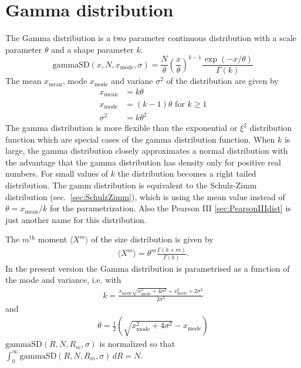 

\clearpage
\section{Gamma distribution}
\label{sec:SZGammaDistr}

The Gamma distribution is a two parameter continuous distribution with
a scale parameter $\theta$ and a shape parameter $k$.
\begin{equation}
\text{gammaSD}(x,N,x_\text{mode},\sigma) =  \frac{N}{\theta}
\left(\frac{x}{\theta}\right)^{k-1}
\frac{\exp(-x/\theta)}{\Gamma(k)} \label{GammaSDEq}
\end{equation}
The mean $x_\text{mean}$, mode $x_\text{mode}$ and variane $\sigma^2$
of the distribution are given by
\begin{align}
x_\text{mean}   &= k\theta \\
x_\text{mode}   &= (k-1)\theta \text{ for } k\geq 1 \\
\sigma^2        &= k\theta^2
\end{align}
The gamma distribution is more flexible than the exponential or $\xi^2$ distribution
function which are special cases of the gamma distribution function.
When $k$ is large, the gamma distribution closely approximates a normal distribution
with the advantage that the gamma distribution has density only for positive real
numbers. For small values of $k$ the distribution becomes a right tailed distribution.
The gamm distribution is equivalent to the Schulz-Zimm distribution (sec.\ \ref{sec:SchulzZimm}), which is using the mean value instead of $\theta=x_\mathrm{mean}/k$ for the parametrization. Also the Pearson III \ref{sec:PearsonIIIdist} is just another name for this distribution.

The $m^\text{th}$ moment $\langle X^m\rangle$ of the size distribution is given by
\begin{align}
\langle X^m\rangle = \theta^m \frac{\Gamma(k+m)}{\Gamma(k)} .
\end{align}
In the present version the Gamma distribution is parametrised as a function
of the mode and variance, i.e.
with
\begin{align}
k=\frac{x_\text{mode} \sqrt{x_\text{mode}^2+4
   \sigma^2}+x_\text{mode}^2+2 \sigma ^2}{2 \sigma^2}
\end{align}
 and
\begin{align}
 \theta = \frac{1}{2}
   \left(\sqrt{x_\text{mode}^2+4 \sigma ^2}-x_\text{mode}\right)
\end{align}
$\text{gammaSD}(R,N,R_m,\sigma)$ is normalized so that
$\int_0^\infty\! \text{gammaSD}(R,N,R_m,\sigma)\,dR = N$.

